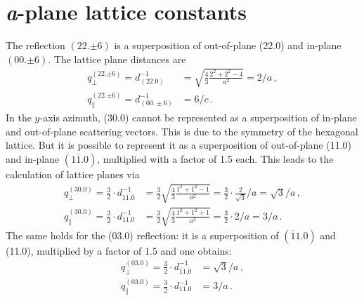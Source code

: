 \section{\textit{a}-plane lattice constants}
\label{Sec:App_Calc_aPlane}
The reflection $(22.{\pm6})$ is a superposition of out-of-plane (22.0) and in-plane $(00.{\pm6})$.
The lattice plane distances are
\begin{align}
    q_\perp^{(22.{\pm6})}=
    d_{(22.0)}^{-1} &=
        \sqrt{\frac{4}{3}\frac{2^2+2^2-4}{a^2}}
        = 2/a\,,\\
    q_\parallel^{(22.{\pm6})}=
    d_{(00.\pm6)}^{-1} &= 6/c \,.
\end{align}
In the $y$-axis azimuth, (30.0) cannot be represented as a superposition of in-plane and out-of-plane scattering vectors.
This is due to the symmetry of the hexagonal lattice.
But it is possible to represent it as a superposition of out-of-plane (11.0) and in-plane $(1\overline{1}.0)$, multiplied with a factor of 1.5 each.
This leads to the calculation of lattice planes via
\begin{align}
    q_\perp^{(30.0)}=
    \frac{3}{2}\cdot d_{1\overline{1}.0}^{-1} &=
        \frac{3}{2}\sqrt{\frac{4}{3}\frac{1^2+1^2-1}{a^2}}
        =\frac{3}{2}\cdot\frac{2}{\sqrt{3}}/a
        =\sqrt{3}/a\,,\\
    q_\parallel^{(30.0)}=
    \frac{3}{2}\cdot d_{11.0}^{-1} &=
        \frac{3}{2}\sqrt{\frac{4}{3}\frac{1^2+1^2+1}{a^2}}
        =\frac{3}{2}\cdot2/a
        =3/a\,.
\end{align}
The same holds for the (03.0) reflection: it is a superposition of $(\overline{1}1.0)$ and (11.0), multiplied by a factor of 1.5 and one obtains:
\begin{align}
    q_\perp^{(03.0)}=
        \frac{3}{2}\cdot d_{\overline{1}1.0}^{-1} &=
        \sqrt{3}/a\,,\\
    q_\parallel^{(03.0)}=
        \frac{3}{2}\cdot d_{11.0}^{-1} &=
        3/a\,.
\end{align}